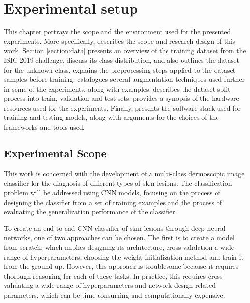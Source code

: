 \chapter{Experimental setup}
\label{chapter:environment}

This chapter portrays the scope and the environment used for the presented experiments. More specifically,  describes the scope and research design of this work. Section \ref{section:data} presents an overview of the training dataset from the \ac{ISIC} 2019 challenge, discuss its class distribution, and also outlines the dataset for the unknown class.  explains the preprocessing steps applied to the dataset samples before training.  catalogues several augmentation techniques used further in some of the experiments, along with examples.  describes the dataset split process into train, validation and test sets.  provides a synopsis of the hardware resources used for the experiments. Finally,  presents the software stack used for training and testing models, along with arguments for the choices of the frameworks and tools used.

\section{Experimental Scope}
\label{section:scope}
    This work is concerned with the development of a multi-class dermoscopic image classifier for the diagnosis of different types of skin lesions. The classification problem will be addressed using \ac{CNN} models, focusing on the process of designing the classifier from a set of training examples and the process of evaluating the generalization performance of the classifier. \par
    
    To create an end-to-end \ac{CNN} classifier of skin lesions through deep neural networks, one of two approaches can be chosen. The first is to create a model from scratch, which implies designing its architecture, cross-validation a wide range of hyperparameters, choosing the weight initialization method and train it from the ground up. However, this approach is troublesome because it requires thorough reasoning for each of these tasks. In practice, this requires cross-validating a wide range of hyperparameters and network design related parameters, which can be time-consuming and computationally expensive. \par
    
